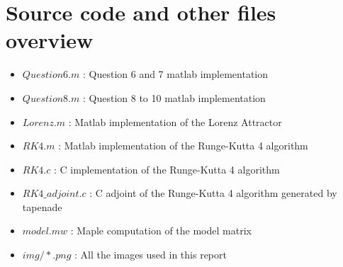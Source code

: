 \documentclass[11pt,a4paper]{article}
\begin{document}
\section {Source code and other files overview}

\begin{itemize}
    \item $Question6.m$ : Question 6 and 7 matlab implementation
    \item $Question8.m$ : Question 8 to 10 matlab implementation
    \item $Lorenz.m$ : Matlab implementation of the Lorenz Attractor
    \item $RK4.m$    : Matlab implementation of the Runge-Kutta 4 algorithm
    \item $RK4.c$    : C implementation of the Runge-Kutta 4 algorithm
    \item $RK4\_adjoint.c$    : C adjoint of the Runge-Kutta 4 algorithm generated by tapenade
    \item $model.mw$ : Maple computation of the model matrix
    \item $img/*.png$ : All the images used in this report

\end{itemize}
\end{document}
